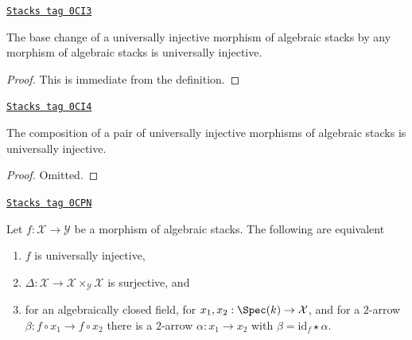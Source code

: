 \begin{lemma}
\label{stacks-morphisms-lemma-base-change-universally-injective}
\href{https://stacks.math.columbia.edu/tag/0CI3}{\texttt{Stacks tag 0CI3}}

The base change of a universally injective morphism of algebraic stacks
by any morphism of algebraic stacks is universally injective.
\end{lemma}

\begin{proof}
This is immediate from the definition.
\end{proof}

\begin{lemma}
\label{stacks-morphisms-lemma-composition-universally-injective}
\href{https://stacks.math.columbia.edu/tag/0CI4}{\texttt{Stacks tag 0CI4}}

The composition of a pair of universally injective morphisms of
algebraic stacks is universally injective.
\end{lemma}

\begin{proof}
Omitted.
\end{proof}

\begin{lemma}
\label{stacks-morphisms-lemma-universally-injective}
\href{https://stacks.math.columbia.edu/tag/0CPN}{\texttt{Stacks tag 0CPN}}

Let $f : \mathcal{X} \to \mathcal{Y}$ be a morphism of algebraic stacks.
The following are equivalent
\begin{enumerate}
\item $f$ is universally injective,
\item $\Delta : \mathcal{X} \to \mathcal{X} \times_\mathcal{Y} \mathcal{X}$
is surjective, and
\item for an algebraically closed field, for
$x_1, x_2 : \Spec(k) \to \mathcal{X}$, and for a $2$-arrow
$\beta : f \circ x_1 \to f \circ x_2$ there is a
$2$-arrow $\alpha : x_1 \to x_2$ with
$\beta = \text{id}_f \star \alpha$.
\end{enumerate}
\end{lemma}

